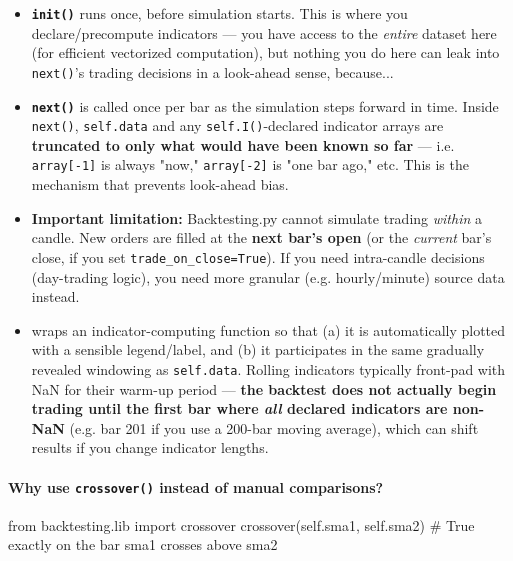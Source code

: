 \documentclass[12pt,openany]{book}
\theoremstyle{definition}
\theoremstyle{remark}
\begin{document}
\begin{itemize}
\item 
\textbf{\texttt{init()}} runs once, before simulation starts. This is where you declare/precompute indicators — you have access to the \emph{entire} dataset here (for efficient vectorized computation), but nothing you do here can leak into \texttt{next()}'s trading decisions in a look-ahead sense, because...

\item 
\textbf{\texttt{next()}} is called once per bar as the simulation steps forward in time. Inside \texttt{next()}, \texttt{self.data} and any \texttt{self.I()}-declared indicator arrays are \textbf{truncated to only what would have been known so far} — i.e. \texttt{array[-1]} is always "now," \texttt{array[-2]} is "one bar ago," etc. This is the mechanism that prevents look-ahead bias.

\item 
\textbf{Important limitation:} Backtesting.py cannot simulate trading \emph{within} a candle. New orders are filled at the \textbf{next bar's open} (or the \emph{current} bar's close, if you set \texttt{trade\_on\_close=True}). If you need intra-candle decisions (day-trading logic), you need more granular (e.g. hourly/minute) source data instead.

\item 
\textbf{}
wraps an indicator-computing function so that (a) it is automatically plotted
with a sensible legend/label, and (b) it participates in the same gradually
revealed windowing as \texttt{self.data}. Rolling indicators typically
front-pad with NaN for their warm-up period — \textbf{the backtest does not
actually begin trading until the first bar where \emph{all} declared
indicators are non-NaN} (e.g. bar 201 if you use a 200-bar moving average),
which can shift results if you change indicator lengths.

\end{itemize}

\paragraph{Why use \texttt{crossover()} instead of manual comparisons?}

\begin{python}
from backtesting.lib import crossover
crossover(self.sma1, self.sma2)   # True exactly on the bar sma1 crosses above sma2
\end{python}
\end{document}

